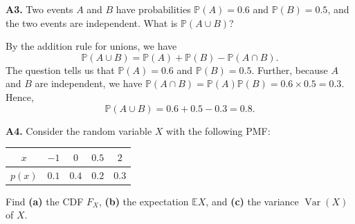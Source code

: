 \documentclass[
  a4paper,
]{book}
\theoremstyle{definition}
\theoremstyle{definition}
\theoremstyle{definition}
\theoremstyle{definition}
\theoremstyle{remark}
\begin{document}
\textbf{A3.} Two events \(A\) and \(B\) have probabilities \(\mathbb P(A) = 0.6\) and \(\mathbb P(B) = 0.5\), and the two events are independent. What is \(\mathbb P(A \cup B)\)?

\begin{myanswers}
By the addition rule for unions, we have
\[ \mathbb P(A \cup B) = \mathbb P(A) + \mathbb P(B) - \mathbb P(A \cap B) . \]
The question tells us that \(\mathbb P(A) = 0.6\) and \(\mathbb P(B) = 0.5\). Further, because \(A\) and \(B\) are independent, we have \(\mathbb P(A \cap B) = \mathbb P(A)\mathbb P(B) = 0.6 \times 0.5 = 0.3\). Hence,
\[ \mathbb P(A \cup B) = 0.6 + 0.5 - 0.3 = 0.8 . \]

\end{myanswers}

\textbf{A4.} Consider the random variable \(X\) with the following PMF:

\begin{longtable}[]{@{}ccccc@{}}
\toprule\noalign{}
\(x\) & \(-1\) & \(0\) & \(0.5\) & \(2\) \\
\midrule\noalign{}
\endhead
\bottomrule\noalign{}
\endlastfoot
\(p(x)\) & \(0.1\) & \(0.4\) & \(0.2\) & \(0.3\) \\
\end{longtable}

Find \textbf{(a)} the CDF \(F_X\), \textbf{(b)} the expectation \(\mathbb EX\), and \textbf{(c)} the variance \(\operatorname{Var}(X)\) of \(X\).
\end{document}
